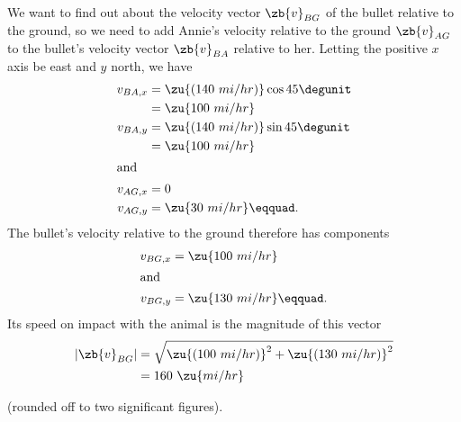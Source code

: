 We want to find out about the velocity vector $\zb{v}_{BG}$ of the bullet relative to the ground,
so we need to add Annie's velocity relative to the ground $\zb{v}_{AG}$ to the bullet's velocity vector $\zb{v}_{BA}$ relative to her. Letting the positive $x$ axis be east and $y$ north, we have
\begin{align*}
	v_{BA,x}	&= \zu{(140\ mi/hr)} \cos 45\degunit \\
			&= \zu{100\ mi/hr} \\
	v_{BA,y}	&= \zu{(140\ mi/hr)} \sin 45\degunit \\
			&= \zu{100\ mi/hr} \\
\intertext{and}
	v_{AG,x}	&= 0 \\
	v_{AG,y}	&= \zu{30\ mi/hr}\eqquad. 
\end{align*}
The bullet's velocity relative to the ground therefore has components
\begin{align*}
	v_{BG,x}	&= \zu{100\ mi/hr}   \\
\intertext{and} 
	v_{BG,y}	&= \zu{130\ mi/hr}\eqquad. \\
\end{align*}
Its speed on impact with the animal is the magnitude of this vector
\begin{align*}
	|\zb{v}_{BG}|	&=  \sqrt{\zu{(100\ mi/hr)}^2+\zu{(130\ mi/hr)}^2}\\
			&= 160\ \zu{mi/hr}
\end{align*}

(rounded off to two significant figures).
